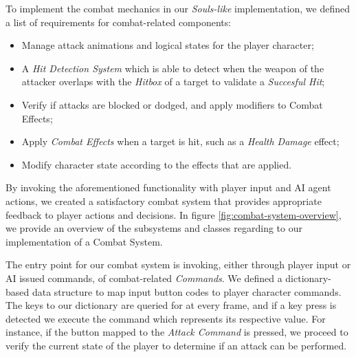 To implement the combat mechanics in our \emph{Souls-like} implementation, we defined a list of requirements for combat-related components:
\begin{itemize}
    \item{Manage attack animations and logical states for the player character;}
    \item{A \emph{Hit Detection System} which is able to detect when the weapon of the attacker overlaps with the \emph{Hitbox} of a target to validate a \emph{Succesful Hit};}
    \item{Verify if attacks are blocked or dodged, and apply modifiers to Combat Effects;}
    \item{Apply \emph{Combat Effects} when a target is hit, such as a \emph{Health Damage} effect;}
    \item{Modify character state according to the effects that are applied.}
\end{itemize}
By invoking the aforementioned functionality with player input and AI agent actions, we created a satisfactory combat system that provides appropriate feedback to player actions and decisions. In figure \ref{fig:combat-system-overview}, we provide an overview of the subsystems and classes regarding to our implementation of a Combat System.





The entry point for our combat system is invoking, either through player input or AI issued commands, of combat-related \emph{Commands}. We defined a dictionary-based data structure to map input button codes to player character commands. The keys to our dictionary are queried for at every frame, and if a key press is detected we execute the command which represents its respective value. For instance, if the button mapped to the \emph{Attack Command} is pressed, we proceed to verify the current state of the player to determine if an attack can be performed.

